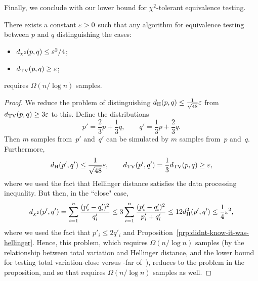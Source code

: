 Finally, we conclude with our lower bound for $\chi^2$-tolerant equivalence testing.

\begin{theorem}\label{thm:twos-lb}
There exists a constant $\varepsilon > 0$ such that any algorithm for equivalence testing between $p$ and $q$ distinguishing the cases:
\begin{itemize}
\item $d_{\chi^2}(p,q) \leq \varepsilon^2/4$;
\item $d_{\mathrm {TV}}(p,q) \geq \varepsilon$;
\end{itemize}
requires $\Omega(n/\log n)$ samples.
\end{theorem}
\begin{proof}
We reduce the problem of distinguishing $d_{\mathrm {H}}(p,q) \leq \frac{1}{\sqrt{48}} \varepsilon$ from $d_{\mathrm {TV}}(p,q) \geq 3\varepsilon$ to this.
Define the distributions
\begin{equation*}
p' = \frac{2}{3} p + \frac{1}{3} q, \qquad q' = \frac{1}{3} p + \frac{2}{3} q.
\end{equation*}
Then $m$ samples from~$p'$ and~$q'$ can be simulated by $m$ samples from~$p$ and~$q$.
Furthermore,
\begin{equation*}
d_{\mathrm {H}}(p',q') \leq \frac{1}{\sqrt{48}} \varepsilon, \qquad d_{\mathrm {TV}}(p',q') = \frac{1}{3} d_{\mathrm {TV}}(p,q) \geq \varepsilon,
\end{equation*}
where we used the fact that Hellinger distance satisfies the data processing inequality.
But then, in the ``close" case,
\begin{equation*}
d_{\chi^2}(p',q')
= \sum_{i=1}^n \frac{(p'_i - q'_i)^2}{q'_i}
\leq 3 \sum_{i=1}^n \frac{(p'_i - q'_i)^2}{p'_i + q'_i}
\leq 12 d_{\mathrm {H}}^2(p',q') \leq \frac{1}{4} \varepsilon^2,
\end{equation*}
where we used the fact that $p'_i \leq 2q'_i$ and Proposition~\ref{prp:didnt-know-it-was-hellinger}.
Hence, this problem, which requires $\Omega(n/\log n)$ samples (by the relationship between total variation and Hellinger distance, and the lower bound for testing total variation-close versus -far of~\cite{ValiantV10a}), reduces to the problem in the proposition, and so that requires $\Omega(n/\log n)$ samples as well.
\end{proof}
